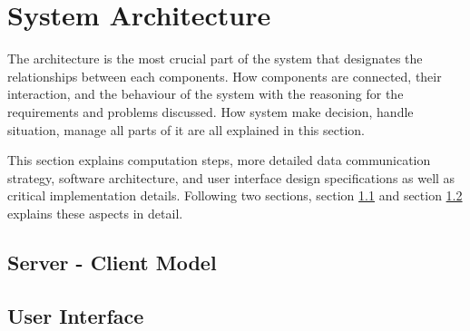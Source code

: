 \section{System Architecture}
\label{sec:system_architecture}
The architecture is the most crucial part of the system that designates the relationships between each components. How components are connected, their interaction, and the behaviour of the system with the reasoning for the requirements and problems discussed. How system make decision, handle situation, manage all parts of it are all explained in this section.

This section explains computation steps, more detailed data communication strategy, software architecture, and user interface design specifications as well as critical implementation details. Following two sections, section \ref{sec:server_client} and section \ref{sec:user_interface} explains these aspects in detail.

\subsection{Server - Client Model}
\label{sec:server_client}


\subsection{User Interface}
\label{sec:user_interface}


% 